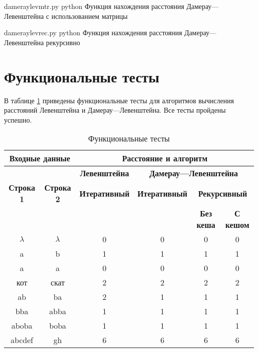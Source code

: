 \clearpage

{dameraylevmtr.py} %
{python} %
{Функция нахождения расстояния Дамерау---Левенштейна с использованием матрицы} %

\clearpage

{dameraylevrec.py} %
{python} %
{Функция нахождения расстояния Дамерау---Левенштейна рекурсивно} %

\clearpage




\section{Функциональные тесты}

В таблице \ref{tbl:func_tests} приведены функциональные тесты для алгоритмов вычисления расстояний Левенштейна и Дамерау---Левенштейна. Все тесты пройдены успешно.

\begin{table}[ht]
	\small
	\begin{center}
		\begin{threeparttable}
			\caption{Функциональные тесты}
			\label{tbl:func_tests}
			\begin{tabular}{|c|c|c|c|c|c|}
				\hline
				\multicolumn{2}{|c|}{\bfseries Входные данные}
				& \multicolumn{4}{c|}{\bfseries Расстояние и алгоритм} \\ 
				\hline 
				&
				& \multicolumn{1}{c|}{\bfseries Левенштейна} 
				& \multicolumn{3}{c|}{\bfseries Дамерау---Левенштейна} \\ \cline{3-6}
				
				\bfseries Строка 1 & \bfseries Строка 2 & \bfseries Итеративный & \bfseries Итеративный
				
				& \multicolumn{2}{c|}{\bfseries Рекурсивный} \\ \cline{5-6}
				& & & & \bfseries Без кеша & \bfseries С кешом \\
				\hline
				$\lambda$ & $\lambda$ & 0 & 0 & 0 & 0 \\
				\hline
				a & b & 1 & 1 & 1 & 1 \\
				\hline
				a & a & 0 & 0 & 0 & 0 \\
				\hline
				кот & скат & 2 & 2 & 2 & 2 \\
				\hline
				ab & ba & 2 & 1 & 1 & 1 \\
				\hline
				bba & abba & 1 & 1 & 1 & 1 \\
				\hline
				aboba & boba & 1 & 1 & 1 & 1 \\
				\hline
				abcdef & gh & 6 & 6 & 6 & 6 \\
				\hline
				
			\end{tabular}	
		\end{threeparttable}
	\end{center}
\end{table}

